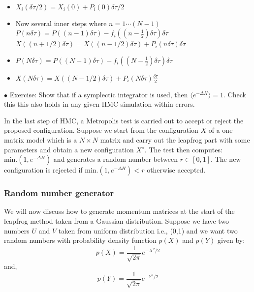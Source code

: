 \documentclass[11pt]{article}
\begin{document}
\begin{itemize}
	\item $X_{i}(\delta \tau/2) = X_{i}(0) + P_{i}(0)\delta \tau/2$
	\item Now several inner steps where $n =  1 \cdots (N-1)$
	\subitem $P(n \delta \tau) = P((n-1) \delta \tau) - f_{i}((n-\frac{1}{2}) \delta \tau) \delta \tau$ 
	\subitem $X((n + 1/2) \delta \tau) = X((n - 1/2) \delta \tau) + P_{i}(n \delta \tau) \delta \tau$
	\item $P(N \delta \tau) = P((N-1) \delta \tau) - f_{i}((N-\frac{1}{2}) \delta \tau) \delta \tau$ 
	\item $X(N \delta \tau) = X((N - 1/2) \delta \tau) + P_{i}(N \delta \tau) \frac{\delta \tau}{2}$ 
	
\end{itemize} 


    \begin{mdframed}[backgroundcolor=blue!3] 
    \textsc{} 
    $\bullet$ Exercise: Show that if a symplectic integrator is used, then $ \langle e^{-\Delta H} \rangle = 1$. Check this this also holds in any given HMC simulation within errors. 
    \end{mdframed} 
    

In the last step of HMC, a Metropolis test is carried out to accept or reject the proposed
configuration. Suppose we start from the configuration $X$ of a one matrix model 
which is a $N \times N$ matrix and carry out the leapfrog part with some parameters and obtain a new configuration 
$X^{\star}$. The test then computes: \texttt{$\text{min.}(1, e^{-\Delta H})$} and generates 
a random number between $r \in [0,1]$. The new configuration is rejected 
if \texttt{$\text{min.}(1, e^{-\Delta H}) < r$} otherwise accepted. 

\subsubsection{Random number generator}  

We will now discuss how to generate momentum matrices at the start of the leapfrog method taken from a Gaussian distribution. Suppose we have two numbers $U$ and $V$ taken from uniform distribution i.e., (0,1)  and we want two random numbers with probability density function $p(X)$ and $p(Y)$ given by:
\begin{equation}
	p(X) = \frac{1}{\sqrt{2\pi}} e^{-X^2/2} 
\end{equation}
and, 
\begin{equation}
	p(Y) = \frac{1}{\sqrt{2\pi}} e^{-Y^2/2} 
\end{equation}
\end{document}
